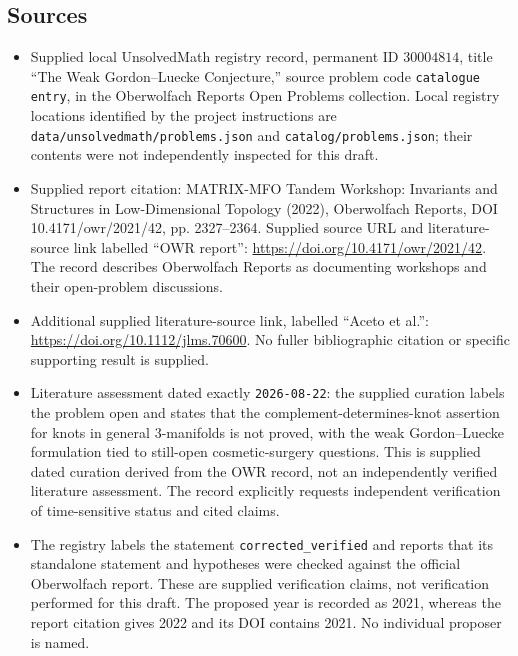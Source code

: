 \documentclass[11pt]{article}
\begin{document}
\subsection{Sources}
\begin{itemize}
\item Supplied local UnsolvedMath registry record, permanent ID \(30004814\), title ``The Weak Gordon--Luecke Conjecture,'' source problem code \texttt{catalogue entry}, in the Oberwolfach Reports Open Problems collection. Local registry locations identified by the project instructions are \texttt{data/unsolvedmath/problems.json} and \texttt{catalog/problems.json}; their contents were not independently inspected for this draft.
\item Supplied report citation: MATRIX-MFO Tandem Workshop: Invariants and Structures in Low-Dimensional Topology (2022), Oberwolfach Reports, DOI 10.4171/owr/2021/42, pp. 2327--2364. Supplied source URL and literature-source link labelled ``OWR report'': \url{https://doi.org/10.4171/owr/2021/42}. The record describes Oberwolfach Reports as documenting workshops and their open-problem discussions.
\item Additional supplied literature-source link, labelled ``Aceto et al.'': \url{https://doi.org/10.1112/jlms.70600}. No fuller bibliographic citation or specific supporting result is supplied.
\item Literature assessment dated exactly \texttt{2026-08-22}: the supplied curation labels the problem open and states that the complement-determines-knot assertion for knots in general \(3\)-manifolds is not proved, with the weak Gordon--Luecke formulation tied to still-open cosmetic-surgery questions. This is supplied dated curation derived from the OWR record, not an independently verified literature assessment. The record explicitly requests independent verification of time-sensitive status and cited claims.
\item The registry labels the statement \texttt{corrected\_verified} and reports that its standalone statement and hypotheses were checked against the official Oberwolfach report. These are supplied verification claims, not verification performed for this draft. The proposed year is recorded as 2021, whereas the report citation gives 2022 and its DOI contains 2021. No individual proposer is named.
\end{itemize}
\end{document}
